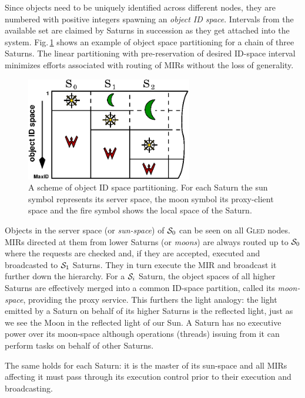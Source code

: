 \documentclass[final]{siamltex}
\def\gled{\textsc{Gled}\xspace}
\begin{document}
Since objects need to be uniquely identified across different nodes,
they are numbered with positive integers spawning an \emph{object ID
 space}. Intervals from the available set are claimed by Saturns in
succession as they get attached into the system.
Fig.\,\ref{fig:ID_space} shows an example of object space partitioning
for a chain of three Saturns. The linear partitioning with
pre-reservation of desired ID-space interval minimizes efforts
associated with routing of MIRs without the loss of generality.

\begin{figure}
\centering
\includegraphics[height=4.5cm]{figs/ID_space.eps}
\caption{A scheme of object ID space partitioning. For each
  Saturn the sun symbol represents its server space, the moon symbol
  its proxy-client space and the fire symbol shows the local space of
  the Saturn.}
\label{fig:ID_space}
\end{figure}

Objects in the server space (or \emph{sun-space}) of ${\cal S}_0$ can
be seen on all \gled nodes. MIRs directed at them from lower Saturns
(or \emph{moons}) are always routed up to ${\cal S}_0$ where the
requests are checked and, if they are accepted, executed and
broadcasted to ${\cal S}_1$ Saturns. They in turn execute the MIR and
broadcast it further down the hierarchy. For a ${\cal S}_i$ Saturn,
the object spaces of all higher Saturns are effectively merged into a
common ID-space partition, called its \emph{moon-space}, providing the
proxy service. This furthers the light analogy: the light emitted by
a Saturn on behalf of its higher Saturns is the reflected light, just
as we see the Moon in the reflected light of our Sun. A Saturn has no
executive power over its moon-space although operations (threads)
issuing from it can perform tasks on behalf of other Saturns.

The same holds for each Saturn: it is the master of its sun-space and
all MIRs affecting it must pass through its execution control prior to
their execution and broadcasting.
\end{document}

